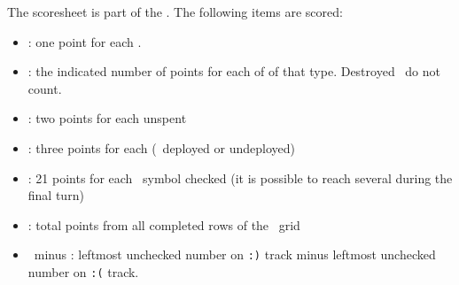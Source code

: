 The scoresheet is part of the \planetsheet.  The following items are scored:
\begin{itemize}
  \item \astronauts: one point for each \astronaut.
  \item \armaments: the indicated number of points for each of \armament of that
        type. Destroyed \armaments\ do not count.
  \item \currency: two points for each unspent \currency
  \item \squadrons: three points for each (\squadron\ deployed or undeployed)
  \item \mastery: 21 points for each \masterysymbol\ symbol checked (it is 
        possible to reach several during the final turn)
  \item \culture: total points from all completed rows of the \culture\ grid
  \item \happiness\ minus \unhappiness: leftmost unchecked number on \texttt{:)}
        track minus leftmost unchecked number on \texttt{:(} track.
\end{itemize}
